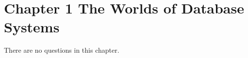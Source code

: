 \documentclass[../../main.tex]{subfiles}
\begin{document}
\section*{Chapter 1 The Worlds of Database Systems}

There are no questions in this chapter.
\end{document}
